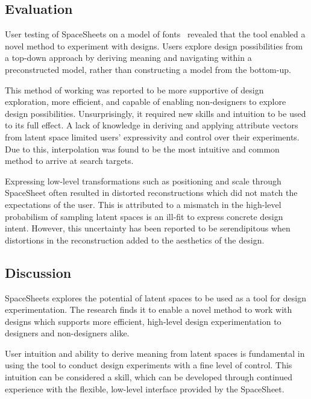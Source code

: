 \documentclass[letterpaper]{article}
\begin{document}
\subsection{Evaluation}

User testing of SpaceSheets on a model of fonts~\cite{loh18} revealed that the tool enabled a novel method to experiment with designs. Users explore design possibilities from a top-down approach by deriving meaning and navigating within a preconstructed model, rather than constructing a model from the bottom-up.

This method of working was reported to be more supportive of design exploration, more efficient, and capable of enabling non-designers to explore design possibilities. Unsurprisingly, it required new skills and intuition to be used to its full effect. A lack of knowledge in deriving and applying attribute vectors from latent space limited users’ expressivity and control over their experiments. Due to this, interpolation was found to be the most intuitive and common method to arrive at search targets.

Expressing low-level transformations such as positioning and scale through SpaceSheet often resulted in distorted reconstructions which did not match the expectations of the user. This is attributed to a mismatch in the high-level probabilism of sampling latent spaces is an ill-fit to express concrete design intent. However, this uncertainty has been reported to be serendipitous when distortions in the reconstruction added to the aesthetics of the design.

\subsection{Discussion}

SpaceSheets explores the potential of latent spaces to be used as a tool for design experimentation. The research finds it to enable a novel method to work with designs which supports more efficient, high-level design experimentation to designers and non-designers alike. 

User intuition and ability to derive meaning from latent spaces is fundamental in using the tool to conduct design experiments with a fine level of control. This intuition can be considered a skill, which can be developed through continued experience with the flexible, low-level interface provided by the SpaceSheet.




\end{document}
